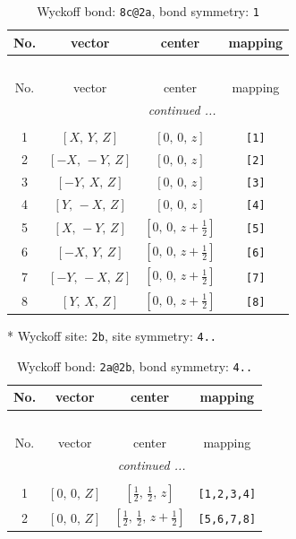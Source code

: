 \documentclass[fleqn,8pt]{jsarticle}
\begin{document}
\renewcommand{\arraystretch}{1.2}
\begin{longtable}{cccc}
\caption{Wyckoff bond: {\tt 8c@2a}, bond symmetry: {\tt 1}}
 \\
 \hline \hline
No. & vector & center & mapping \\ \hline \endfirsthead

\multicolumn{3}{l}{\tablename\ \thetable{}} \\
 \hline \hline
No. & vector & center & mapping \\ \hline \endhead

 \hline \hline
\multicolumn{3}{r}{\footnotesize\it continued ...} \\ \endfoot

 \hline \hline
\multicolumn{3}{r}{} \\ \endlastfoot

1 & $\left[ X,\, Y,\, Z \right]$ & $\left[ 0,\, 0,\, z \right]$ & {\tt [1]} \\ \hline
2 & $\left[ - X,\, - Y,\, Z \right]$ & $\left[ 0,\, 0,\, z \right]$ & {\tt [2]} \\ \hline
3 & $\left[ - Y,\, X,\, Z \right]$ & $\left[ 0,\, 0,\, z \right]$ & {\tt [3]} \\ \hline
4 & $\left[ Y,\, - X,\, Z \right]$ & $\left[ 0,\, 0,\, z \right]$ & {\tt [4]} \\ \hline
5 & $\left[ X,\, - Y,\, Z \right]$ & $\left[ 0,\, 0,\, z + \frac{1}{2} \right]$ & {\tt [5]} \\ \hline
6 & $\left[ - X,\, Y,\, Z \right]$ & $\left[ 0,\, 0,\, z + \frac{1}{2} \right]$ & {\tt [6]} \\ \hline
7 & $\left[ - Y,\, - X,\, Z \right]$ & $\left[ 0,\, 0,\, z + \frac{1}{2} \right]$ & {\tt [7]} \\ \hline
8 & $\left[ Y,\, X,\, Z \right]$ & $\left[ 0,\, 0,\, z + \frac{1}{2} \right]$ & {\tt [8]} \\
\end{longtable}
* Wyckoff site: {\tt 2b}, site symmetry: {\tt 4..}
\renewcommand{\arraystretch}{1.2}
\begin{longtable}{cccc}
\caption{Wyckoff bond: {\tt 2a@2b}, bond symmetry: {\tt 4..}}
 \\
 \hline \hline
No. & vector & center & mapping \\ \hline \endfirsthead

\multicolumn{3}{l}{\tablename\ \thetable{}} \\
 \hline \hline
No. & vector & center & mapping \\ \hline \endhead

 \hline \hline
\multicolumn{3}{r}{\footnotesize\it continued ...} \\ \endfoot

 \hline \hline
\multicolumn{3}{r}{} \\ \endlastfoot

1 & $\left[ 0,\, 0,\, Z \right]$ & $\left[ \frac{1}{2},\, \frac{1}{2},\, z \right]$ & {\tt [1,2,3,4]} \\ \hline
2 & $\left[ 0,\, 0,\, Z \right]$ & $\left[ \frac{1}{2},\, \frac{1}{2},\, z + \frac{1}{2} \right]$ & {\tt [5,6,7,8]} \\
\end{longtable}
\end{document}
